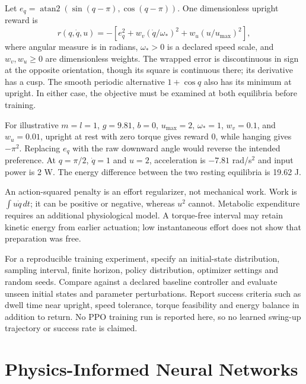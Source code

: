 Let $e_q=\operatorname{atan2}(\sin(q-\pi),\cos(q-\pi))$. One dimensionless upright reward is
\begin{equation}
r(q,\dot q,u)=-\left[e_q^2+
w_v(\dot q/\omega_*)^2+w_u(u/u_{\max})^2\right],
\end{equation}
where angular measure is in radians, $\omega_*>0$ is a declared speed scale, and $w_v,w_u\ge0$ are dimensionless weights. The wrapped error is discontinuous in sign at the opposite orientation, though its square is continuous there; its derivative has a cusp. The smooth periodic alternative $1+\cos q$ also has its minimum at upright. In either case, the objective must be examined at both equilibria before training.

For illustrative $m=l=1$, $g=9.81$, $b=0$, $u_{\max}=2$, $\omega_*=1$, $w_v=0.1$, and $w_u=0.01$, upright at rest with zero torque gives reward 0, while hanging gives $-\pi^2$. Replacing $e_q$ with the raw downward angle would reverse the intended preference. At $q=\pi/2$, $\dot q=1$ and $u=2$, acceleration is $-7.81$ rad/s$^2$ and input power is 2 W. The energy difference between the two resting equilibria is 19.62 J.

An action-squared penalty is an effort regularizer, not mechanical work. Work is $\int u\dot q\,dt$; it can be positive or negative, whereas $u^2$ cannot. Metabolic expenditure requires an additional physiological model. A torque-free interval may retain kinetic energy from earlier actuation; low instantaneous effort does not show that preparation was free.

For a reproducible training experiment, specify an initial-state distribution, sampling interval, finite horizon, policy distribution, optimizer settings and random seeds. Compare against a declared baseline controller and evaluate unseen initial states and parameter perturbations. Report success criteria such as dwell time near upright, speed tolerance, torque feasibility and energy balance in addition to return. No PPO training run is reported here, so no learned swing-up trajectory or success rate is claimed.

\section{Physics-Informed Neural Networks}

